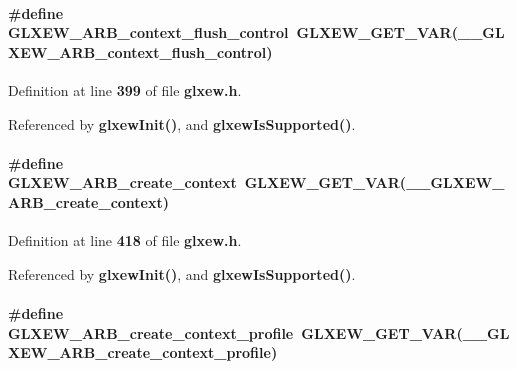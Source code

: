 \paragraph[{G\+L\+X\+E\+W\+\_\+\+A\+R\+B\+\_\+context\+\_\+flush\+\_\+control}]{\setlength{\rightskip}{0pt plus 5cm}\#define G\+L\+X\+E\+W\+\_\+\+A\+R\+B\+\_\+context\+\_\+flush\+\_\+control~{\bf G\+L\+X\+E\+W\+\_\+\+G\+E\+T\+\_\+\+V\+AR}({\bf \+\_\+\+\_\+\+G\+L\+X\+E\+W\+\_\+\+A\+R\+B\+\_\+context\+\_\+flush\+\_\+control})}\label{glxew_8h_a34d6ca2b0779f710042a31c32ce637b6}


Definition at line {\bf 399} of file {\bf glxew.\+h}.



Referenced by {\bf glxew\+Init()}, and {\bf glxew\+Is\+Supported()}.

\paragraph[{G\+L\+X\+E\+W\+\_\+\+A\+R\+B\+\_\+create\+\_\+context}]{\setlength{\rightskip}{0pt plus 5cm}\#define G\+L\+X\+E\+W\+\_\+\+A\+R\+B\+\_\+create\+\_\+context~{\bf G\+L\+X\+E\+W\+\_\+\+G\+E\+T\+\_\+\+V\+AR}({\bf \+\_\+\+\_\+\+G\+L\+X\+E\+W\+\_\+\+A\+R\+B\+\_\+create\+\_\+context})}\label{glxew_8h_aef12539be4b3ad28d799421fa4054b8e}


Definition at line {\bf 418} of file {\bf glxew.\+h}.



Referenced by {\bf glxew\+Init()}, and {\bf glxew\+Is\+Supported()}.

\paragraph[{G\+L\+X\+E\+W\+\_\+\+A\+R\+B\+\_\+create\+\_\+context\+\_\+profile}]{\setlength{\rightskip}{0pt plus 5cm}\#define G\+L\+X\+E\+W\+\_\+\+A\+R\+B\+\_\+create\+\_\+context\+\_\+profile~{\bf G\+L\+X\+E\+W\+\_\+\+G\+E\+T\+\_\+\+V\+AR}({\bf \+\_\+\+\_\+\+G\+L\+X\+E\+W\+\_\+\+A\+R\+B\+\_\+create\+\_\+context\+\_\+profile})}\label{glxew_8h_a45d1b49ce1ce7922558461afb0882880}


